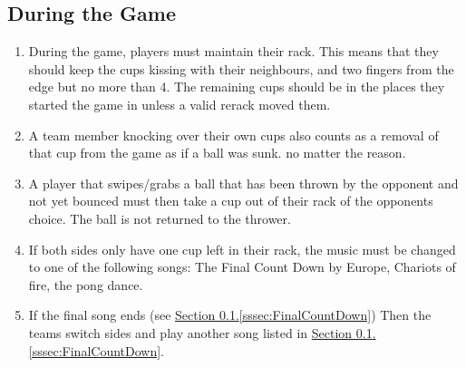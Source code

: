 	\subsection{During the Game}\label{ssec:DuringGame}
		\begin{enumerate}[label=(\roman*), ref=\roman*]
            \item \label{sssec:MaintainRack} During the game, players must maintain their rack.
                This means that they should keep the cups kissing with their neighbours, and two fingers from the edge but no more than 4.
                The remaining cups should be in the places they started the game in unless a valid rerack moved them.
            \item \label{sssec:Knockover} A team member knocking over their own cups also counts as a removal of that cup from the game as if a ball was sunk. no matter the reason.
            \item \label{sssec:swiping_no_bounce} A player that swipes/grabs a ball that has been thrown by the opponent and not yet bounced must then take a cup out of their rack of the opponents choice.
                The ball is not returned to the thrower.
            \item \label{sssec:FinalCountDown} If both sides only have one cup left in their rack, the music must be changed to one of the following songs: The Final Count Down by Europe, Chariots of fire, the pong dance.
            \item \label{sssec:finalSongEnd} If the final song ends (see \hyperref[sssec:FinalCountDown]{Section \ref*{ssec:DuringGame}.\ref*{sssec:FinalCountDown}}) Then the teams switch sides and play another song listed in \hyperref[sssec:FinalCountDown]{Section \ref*{ssec:DuringGame}.\ref*{sssec:FinalCountDown}}.
        \end{enumerate}
